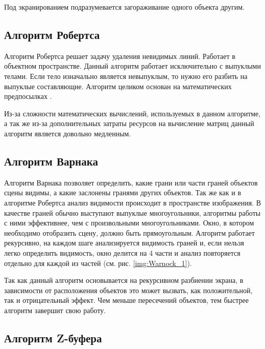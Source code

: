 Под экранированием подразумевается загораживание одного объекта другим.

\subsection{Алгоритм Робертса}

Алгоритм Робертса решает задачу удаления невидимых линий. Работает в объектном пространстве. Данный алгоритм работает исключительно с выпуклыми телами. Если тело изначально является невыпуклым, то нужно его разбить на выпуклые составляющие. Алгоритм целиком основан на математических предпосылках \cite{rogers}.

Из-за сложности математических вычислений, используемых в данном алгоритме, а так же из-за дополнительных затраты ресурсов на вычисление матриц данный алгоритм является довольно медленным.


\subsection{Алгоритм Варнака}

Алгоритм Варнака \cite{rogers,shykin,bayackovskiy} позволяет определить, какие грани или части граней объектов сцены видимы, а какие заслонены гранями других объектов. Так же как и в алгоритме Робертса анализ видимости происходит в пространстве изображения. В качестве граней обычно выступают выпуклые многоугольники, алгоритмы работы с ними эффективнее, чем с произвольными многоугольниками. Окно, в котором необходимо отобразить сцену, должно быть прямоугольным. Алгоритм работает рекурсивно, на каждом шаге анализируется видимость граней и, если нельзя легко определить видимость, окно делится на 4 части и анализ повторяется отдельно для каждой из частей (см. рис. \ref{img:Warnock_1}).


Так как данный алгоритм основывается на рекурсивном разбиении экрана, в зависимости от расположения объектов это может вызвать, как положительной, так и отрицательный эффект. Чем меньше пересечений объектов, тем быстрее алгоритм завершит свою работу.

\subsection{Алгоритм Z-буфера}

